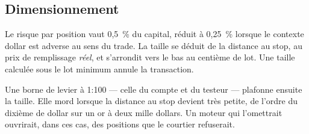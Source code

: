 \subsection{Dimensionnement}

Le risque par position vaut 0,5~\% du capital, réduit à 0,25~\% lorsque le
contexte dollar est adverse au sens du trade. La taille se déduit de la
distance au stop, au prix de remplissage \emph{réel}, et s'arrondit vers le
bas au centième de lot. Une taille calculée sous le lot minimum annule la
transaction.

Une borne de levier à 1:100 --- celle du compte et du testeur --- plafonne
ensuite la taille. Elle mord lorsque la distance au stop devient très petite,
de l'ordre du dixième de dollar sur un or à deux mille dollars. Un moteur qui
l'omettrait ouvrirait, dans ces cas, des positions que le courtier refuserait.
